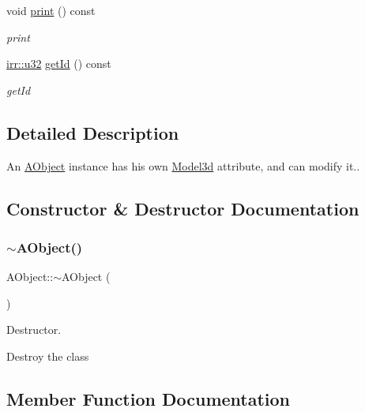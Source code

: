 \begin{DoxyCompactItemize}
void \hyperlink{classAObject_aebbd61ad13e23fa7787a5cdf12acd4ca}{print} () const
\begin{DoxyCompactList}\small\item\em print \end{DoxyCompactList}\item 
\hyperlink{namespaceirr_a0416a53257075833e7002efd0a18e804}{irr\+::u32} \hyperlink{classAObject_aae823d79b9bfa1ef090ee9e7b764de4a}{get\+Id} () const
\begin{DoxyCompactList}\small\item\em get\+Id \end{DoxyCompactList}\end{DoxyCompactItemize}


\subsection{Detailed Description}
An \hyperlink{classAObject}{A\+Object} instance has his own \hyperlink{classModel3d}{Model3d} attribute, and can modify it.. 

\subsection{Constructor \& Destructor Documentation}
\mbox{\label{classAObject_ac17f3a1944792c280a3cbd83d839bc4e}} 
\subsubsection{\texorpdfstring{$\sim$\+A\+Object()}{~AObject()}}
{\footnotesize\ttfamily A\+Object\+::$\sim$\+A\+Object (\begin{DoxyParamCaption}{ }\end{DoxyParamCaption})}



Destructor. 

Destroy the class 

\subsection{Member Function Documentation}
\mbox{\label{classAObject_aae823d79b9bfa1ef090ee9e7b764de4a}} 
